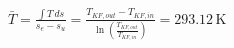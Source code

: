 \( \bar{T} = \frac{\int T \, ds}{s_{e} - s_{u}} = \frac{T_{KF,out} - T_{KF,in}}{\ln \left( \frac{T_{KF,out}}{T_{KF,in}} \right)} = 293.12 \, \text{K} \)